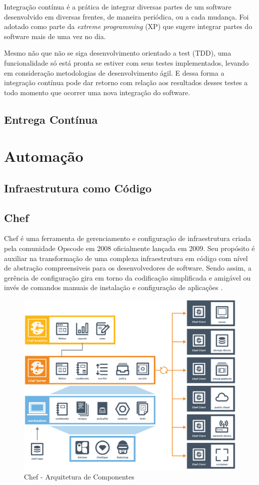 Integração contínua é a prática de integrar diversas partes de um software
desenvolvido em diversas frentes, de maneira periódica, ou a cada mudança.
Foi adotado como parte da \textit{extreme programming} (XP) que sugere integrar
partes do software mais de uma vez no dia.

Mesmo não que não se siga desenvolvimento orientado a test (TDD), uma
funcionalidade só está pronta se estiver com seus testes implementados,
levando em consideração metodologias de desenvolvimento ágil. E dessa
forma a integração contínua pode dar retorno com relação aos resultados desses
testes a todo momento que ocorrer uma nova integração do software.

\subsection{Entrega Contínua}

\section{Automação}

\subsection{Infraestrutura como Código}

\subsection{Chef}
\label{sec:chef}

Chef é uma ferramenta de gerenciamento e configuração de infraestrutura criada
pela comunidade Opscode em 2008 oficialmente lançada em 2009. Seu propósito é
auxiliar na transformação de uma complexa infraestrutura em código com nível
de abstração compreensiveis para os desenvolvedores de software. Sendo assim,
a gerência de configuração gira em torno da codificação simplificada e amigável
ou invés de comandos manuais de instalação e configuração de aplicações
\cite{sharma:2015}.

\begin{figure}[h]
  \label{fig:arch_chef}
  \centering
  \includegraphics[width=\textwidth]{figuras/arch_chef.eps}
  \caption{Chef - Arquitetura de Componentes}
\end{figure}

